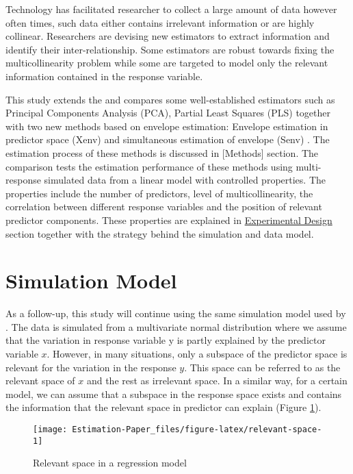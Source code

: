 \documentclass[12pt,3p,authoryear]{elsarticle}
\begin{document}
Technology has facilitated researcher to collect a large amount of data
however often times, such data either contains irrelevant information or
are highly collinear. Researchers are devising new estimators to extract
information and identify their inter-relationship. Some estimators are
robust towards fixing the multicollinearity problem while some are
targeted to model only the relevant information contained in the
response variable.

This study extends the \citep{rimal2019pred} and compares some
well-established estimators such as Principal Components Analysis (PCA),
Partial Least Squares (PLS) together with two new methods based on
envelope estimation: Envelope estimation in predictor space (Xenv)
\citep{cook2010envelope} and simultaneous estimation of envelope (Senv)
\citep{cook2015simultaneous}. The estimation process of these methods is
discussed in {[}Methods{]} section. The comparison tests the estimation
performance of these methods using multi-response simulated data from a
linear model with controlled properties. The properties include the
number of predictors, level of multicollinearity, the correlation
between different response variables and the position of relevant
predictor components. These properties are explained in
\protect\hyperlink{experimental-design}{Experimental Design} section
together with the strategy behind the simulation and data model.

\section{Simulation Model}\label{simulation-model}

As a follow-up, this study will continue using the same simulation model
used by \citet{rimal2019pred}. The data is simulated from a multivariate
normal distribution where we assume that the variation in response
variable y is partly explained by the predictor variable \(x\). However,
in many situations, only a subspace of the predictor space is relevant
for the variation in the response \(y\). This space can be referred to
as the relevant space of \(x\) and the rest as irrelevant space. In a
similar way, for a certain model, we can assume that a subspace in the
response space exists and contains the information that the relevant
space in predictor can explain (Figure \ref{fig:relevant-space}).

\begin{figure}

{\centering \texttt{[image: Estimation-Paper\_files/figure-latex/relevant-space-1]} 

}

\caption{Relevant space in a regression model}\label{fig:relevant-space}
\end{figure}
\end{document}
